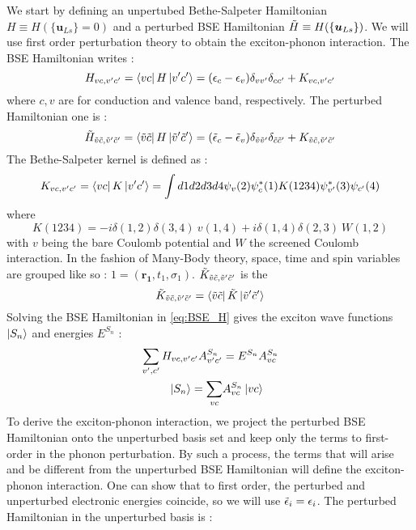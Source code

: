 We start by defining an unpertubed Bethe-Salpeter Hamiltonian $H \equiv H(\{\boldsymbol{u}_{Ls} \}=0)$ and a perturbed BSE Hamiltonian $\Tilde{H} \equiv H(\{\boldsymbol{u}_{Ls} \})$. We will use first order perturbation theory to obtain the exciton-phonon interaction. The BSE Hamiltonian writes :
\begin{equation}
    H_{vc,v'c'} = \bra{vc} H \ket{v'c'} = ( \epsilon_c - \epsilon_v ) \delta_{vv'}\delta_{cc'} + K_{vc,v'c'}
    \label{eq:BSE_H}
\end{equation}
where $c,v$ are for conduction and valence band, respectively. The perturbed Hamiltonian one is :
\begin{equation}
    \Tilde{H}_{\Tilde{v}\Tilde{c},\Tilde{v}'\Tilde{c}'}  = \bra{\Tilde{v}\Tilde{c}} H \ket{\Tilde{v}'\Tilde{c}'}  = ( \Tilde{\epsilon}_c - \Tilde{\epsilon}_v ) \delta_{\Tilde{v}\Tilde{v}'}\delta_{\Tilde{c}\Tilde{c}'} + K_{\Tilde{v}\Tilde{c},\Tilde{v}'\Tilde{c}'}
\end{equation}
The Bethe-Salpeter kernel is defined as :
\begin{equation}
    K_{vc,v'c'} = \bra{vc} K \ket{v'c'} = \int d1 d2 d3 d4 \psi_v(2) \psi_c^*(1) K(1234) \psi^*_{v'}(3)\psi_{c'}(4)
\end{equation}
where
\begin{equation}
    K(1234) = -i\delta(1,2)\delta(3,4)\ v(1,4) + i \delta(1,4)\delta(2,3)\ W(1,2)
\end{equation}
with $v$ being the bare Coulomb potential and $W$ the screened Coulomb interaction. In the fashion of Many-Body theory, space, time and spin variables are grouped like so : $1 = (\boldsymbol{r_1},t_1,\sigma_1)$. $\Tilde{K}_{\Tilde{v}\Tilde{c},\Tilde{v}'\Tilde{c}'}$ is the 
\begin{equation}
    \Tilde{K}_{\Tilde{v}\Tilde{c},\Tilde{v}'\Tilde{c}'} = \bra{\Tilde{v}\Tilde{c}} \Tilde{K} \ket{\Tilde{v}'\Tilde{c}'} 
\end{equation}
Solving the BSE Hamiltonian in \eqref{eq:BSE_H} gives the exciton wave functions $\ket{S_n}$ and energies $E^{S_n}$ :
\begin{align}
    \sum_{v',c'} H_{vc,v'c'} A^{S_n}_{v'c'} &= E^{S_n} A^{S_n}_{vc} \\
    \ket{S_n} = \sum_{vc}& A_{vc}^{S_n}\ket{vc}
\end{align}
To derive the exciton-phonon interaction, we project the perturbed BSE Hamiltonian onto the unperturbed basis set and keep only the terms to first-order in the phonon perturbation. By such a process, the terms that will arise and be different from the unperturbed BSE Hamiltonian will define the exciton-phonon interaction. One can show that to first order, the perturbed and unperturbed electronic energies coincide, so we will use $\Tilde{\epsilon}_i = \epsilon_i$. The perturbed Hamiltonian in the unperturbed basis is :
